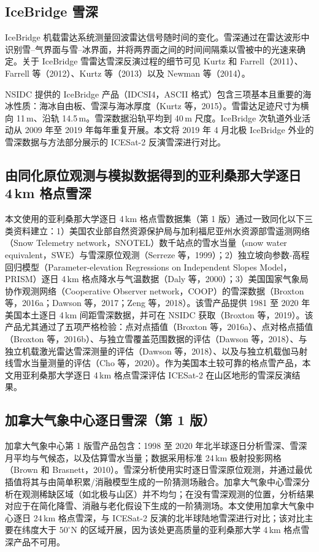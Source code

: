 \subsection{IceBridge 雪深}
IceBridge 机载雷达系统测量回波雷达信号随时间的变化。雪深通过在雷达波形中识别雪--气界面与雪--冰界面，并将两界面之间的时间间隔乘以雪被中的光速来确定。关于 IceBridge 雪雷达雪深反演过程的细节可见 Kurtz 和 Farrell（2011）、Farrell 等（2012）、Kurtz 等（2013）以及 Newman 等（2014）。

NSIDC 提供的 IceBridge 产品（IDCSI4，ASCII 格式）包含三项基本且重要的海冰性质：海冰自由板、雪深与海冰厚度（Kurtz 等，2015）。雪雷达足迹尺寸为横向 11\,m、沿轨 14.5\,m。雪深数据沿轨平均到 40\,m 尺度。IceBridge 次轨道外业活动从 2009 年至 2019 年每年重复开展。本文将 2019 年 4 月北极 IceBridge 外业的雪深数据与方法部分展示的 ICESat-2 反演雪深进行对比。

\subsection[由同化原位观测与模拟数据得到的亚利桑那大学逐日 4 km 格点雪深]{由同化原位观测与模拟数据得到的亚利桑那大学逐日 4\,km 格点雪深}
本文使用的亚利桑那大学逐日 4\,km 格点雪数据集（第 1 版）通过一致同化以下三类资料建立：1）美国农业部自然资源保护局与加利福尼亚州水资源部雪遥测网络（Snow Telemetry network，SNOTEL）数千站点的雪水当量（snow water equivalent，SWE）与雪深原位观测（Serreze 等，1999）；2）独立坡向参数-高程回归模型（Parameter-elevation Regressions on Independent Slopes Model，PRISM）逐日 4\,km 格点降水与气温数据（Daly 等，2000）；3）美国国家气象局协作观测网络（Cooperative Observer network，COOP）的雪深数据（Broxton 等，2016a；Dawson 等，2017；Zeng 等，2018）。该雪产品提供 1981 至 2020 年美国本土逐日 4\,km 间距雪深数据，并可在 NSIDC 获取（Broxton 等，2019）。该产品尤其通过了五项严格检验：点对点插值（Broxton 等，2016a）、点对格点插值（Broxton 等，2016b）、与独立雪覆盖范围数据的评估（Dawson 等，2018）、与独立机载激光雷达雪深测量的评估（Dawson 等，2018）、以及与独立机载伽马射线雪水当量测量的评估（Cho 等，2020）。作为美国本土较可靠的格点雪产品，本文用亚利桑那大学逐日 4\,km 格点雪深评估 ICESat-2 在山区地形的雪深反演结果。

\subsection{加拿大气象中心逐日雪深（第 1 版）}
加拿大气象中心第 1 版雪产品包含：1998 至 2020 年北半球逐日分析雪深、雪深月平均与气候态，以及估算雪水当量；数据采用标准 24\,km 极射投影网格（Brown 和 Brasnett，2010）。雪深分析使用实时逐日雪深原位观测，并通过最优插值将其与由简单积累/消融模型生成的一阶猜测场融合。加拿大气象中心雪深分析在观测稀缺区域（如北极与山区）并不均匀；在没有雪深观测的位置，分析结果对应于在简化降雪、消融与老化假设下生成的一阶猜测场。本文使用加拿大气象中心逐日 24\,km 格点雪深，与 ICESat-2 反演的北半球陆地雪深进行对比；该对比主要在纬度大于 $50^\circ$N 的区域开展，因为该处更高质量的亚利桑那大学 4\,km 格点雪深产品不可用。

